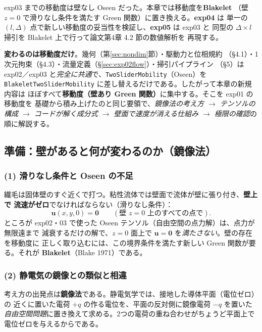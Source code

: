 \documentclass[11pt,a4paper]{article}
\begin{document}
exp03 までの移動度は壁なし Oseen だった。本章では移動度を\textbf{Blakelet}
（壁 $z=0$ で滑りなし条件を満たす Green 関数）に置き換える。\textbf{exp04} は
単一の $(l,\Delta)$ 点で新しい移動度の妥当性を検証し、\textbf{exp05} は exp03 と
同型の $\Delta\times l$ 掃引を Blakelet 上で行って論文第4章 4.2 節の数値解析を
再現する。

\begin{keybox}
\textbf{変わるのは移動度だけ}。幾何（第\ref{sec:nondim}節）・駆動力と位相規約
（§4.1）・1次元拘束（§4.3）・流量定義（§\ref{sec:exp02flow}）・掃引パイプライン
（§5）は exp02／exp03 と\emph{完全に共通}で、\texttt{TwoSliderMobility}（Oseen）を
\texttt{BlakeletTwoSliderMobility} に差し替えるだけである。したがって本章の新規内容は
ほぼすべて\textbf{移動度（壁あり Green 関数）}に集中する。そこを exp01 の移動度を
基礎から積み上げたのと同じ要領で、\emph{鏡像法の考え方 $\to$ テンソルの構成 $\to$
コードが解く成分式 $\to$ 壁面で速度が消える仕組み $\to$ 極限の確認}の順に解説する。
\end{keybox}

\subsection{準備：壁があると何が変わるのか（鏡像法）}\label{sec:images}

\subsubsection{(1) 滑りなし条件と Oseen の不足}

繊毛は固体壁のすぐ近くで打つ。粘性流体では壁面で流体が壁に張り付き、\textbf{壁上で
流速がゼロ}でなければならない（滑りなし条件）：
\begin{equation}
\bm u(x,y,0)=\bm 0\qquad(\text{壁 }z=0\text{ 上のすべての点で}).
\end{equation}
ところが exp02・03 で使った Oseen テンソル（自由空間の点力解）は、点力が無限遠まで
減衰するだけの解で、$z=0$ 面上で $\bm u=\bm 0$ を\emph{満たさない}。壁の存在を移動度に
正しく取り込むには、この境界条件を満たす新しい Green 関数が要る。それが
\textbf{Blakelet}（Blake 1971）である。

\subsubsection{(2) 静電気の鏡像との類似と相違}

考え方の出発点は\textbf{鏡像法}である。静電気学では、接地した導体平面（電位ゼロ）の
近くに置いた電荷 $+q$ の作る電位を、平面の反対側に鏡像電荷 $-q$ を置いた
\emph{自由空間問題}に置き換えて求める。2つの電荷の重ね合わせがちょうど平面上で
電位ゼロを与えるからである。
\end{document}
